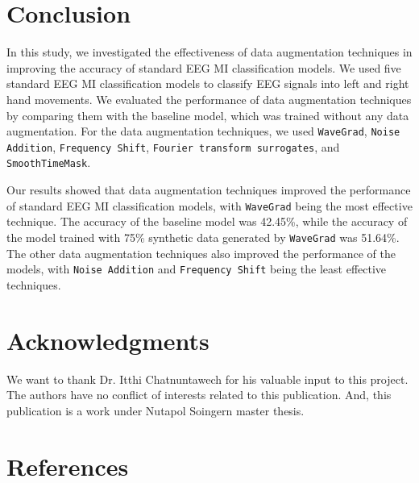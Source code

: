 \documentclass[12pt]{iopart}
\begin{document}










\section{Conclusion}
In this study, we investigated the effectiveness of data augmentation techniques in improving the accuracy of standard EEG MI classification models. 
We used five standard EEG MI classification models to classify EEG signals into left and right hand movements. 
We evaluated the performance of data augmentation techniques by comparing them with the baseline model, which was trained without any data augmentation. 
For the data augmentation techniques, we used \texttt{WaveGrad}, \texttt{Noise Addition}, \texttt{Frequency Shift}, \texttt{Fourier transform surrogates}, and \texttt{SmoothTimeMask}.

Our results showed that data augmentation techniques improved the performance of standard EEG MI classification models, with \texttt{WaveGrad} being the most effective technique. 
The accuracy of the baseline model was 42.45\%, while the accuracy of the model trained with 75\% synthetic data generated by \texttt{WaveGrad} was 51.64\%. 
The other data augmentation techniques also improved the performance of the models, with \texttt{Noise Addition} and \texttt{Frequency Shift} being the least effective techniques.

\section{Acknowledgments}

We want to thank Dr. Itthi Chatnuntawech for his valuable input to this project. 
The authors have no conflict of interests related to this publication.
And, this publication is a work under Nutapol Soingern master thesis.

\section*{References}


\end{document}
